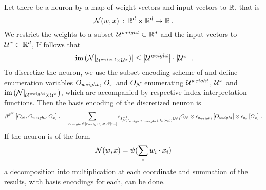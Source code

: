 \begin{example}
    Let there be a neuron by a map of weight vectors and input vectors to $\mathbb{R}$, that is
    \[ \mathcal{N}( w, x)\,:\, \mathbb{R}^{d} \times \mathbb{R}^{d} \rightarrow \mathbb{R} \, .\]
    We restrict the weights to a subset $\mathcal{U}^{weight}\subset\mathbb{R}^{d}$ and the input vectors to $\mathcal{U}^{x}\subset\mathbb{R}^{d}$,
    If follows that
    \[ \left|\mathrm{im}\left({\mathcal{N}}|_{\mathcal{U}^{weight}\times\mathcal{U}^{x}}\right)\right| \leq \left|\mathcal{U}^{weight}\right| \cdot \left|\mathcal{U}^{x}\right| \, . \]
    To discretize the neuron, we use the subset encoding scheme of  and define enumeration variables $O_{weight}$, $O_{x}$ and $O_{\mathcal{N}}$ enumerating $\mathcal{U}^{weight}$, $\mathcal{U}^{x}$ and $\mathrm{im}\left({\mathcal{N}}|_{\mathcal{U}^{weight}\times\mathcal{U}^{x}}\right)$, which are accompanied by respective index interpretation functions.
    Then the basis encoding of the discretized neuron is
    \begin{align*}
        \beta^{\sigma^{\mathcal{N}}}\left[O_{\mathcal{N}},O_{weight},O_{x}\right] \, .
        = \sum_{o_{weight}\in[r_{weight}],o_{x}\in[r_{x}]}
        \epsilon_{I_{\mathcal{N}(I_{weight}(o_{weight}),I_{x}(o_{x}))}^{-1}(\mathcal{N})}{O_{\mathcal{N}}}
        \otimes \epsilon_{o_{weight}}\left[O_{weight}\right]
        \otimes \epsilon_{o_{x}}\left[O_{x}\right] \, .
    \end{align*}
    If the neuron is of the form
    \[ \mathcal{N}(w,x) = \psi(\sum_i w_i \cdot x_i)\]
    a decomposition into multiplication at each coordinate and summation of the results, with basis encodings for each, can be done.
\end{example}
